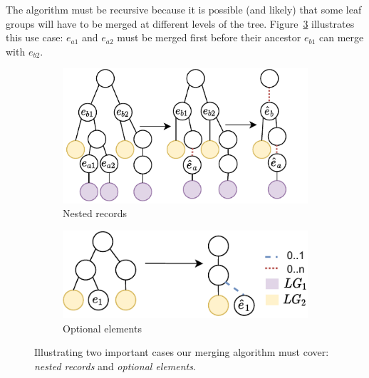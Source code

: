 \documentclass[sigconf,authordraft]{acmart}
\theoremstyle{definition}
\begin{document}
The algorithm must be recursive because it is possible (and likely) that some leaf groups will have to be merged at different levels of the tree. 
Figure~\ref{fig:intra-use-cases} illustrates this use case: $e_{a1}$ and $e_{a2}$ must be merged first before their ancestor $e_{b1}$ can merge with $e_{b2}$.

\begin{figure}[ht]
  \centering
  \begin{subfigure}{0.4\textwidth}
    \centering
    \includegraphics[width=.9\linewidth]{explanations/intra-recursivity}
    \caption{Nested records}
    \label{fig:nested_records}
  \end{subfigure}
  \begin{subfigure}{0.4\textwidth}
    \centering 
    \includegraphics[width=.9\linewidth]{explanations/intra-optional}
    \caption{Optional elements}
    \label{fig:optional_elements}
  \end{subfigure}
  \caption{Illustrating two important cases our merging algorithm must cover: \emph{nested records} and \emph{optional elements}.}
  \label{fig:intra-use-cases}
\end{figure}
\end{document}

